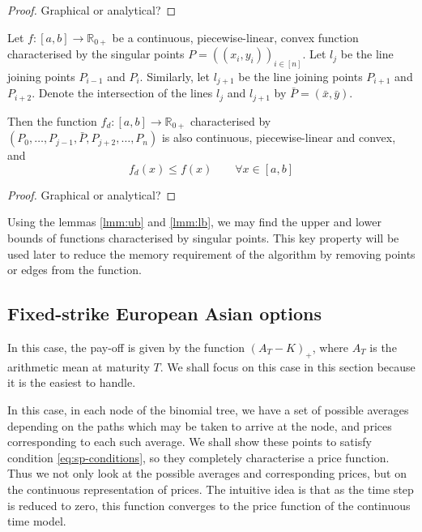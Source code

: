 \begin{proof}
	Graphical or analytical?
\end{proof}

\begin{lmm}
	\label{lmm:lb}
	Let $ f:[a,b] \to \mathbb{R}_{0+} $ be a continuous, piecewise-linear, convex function characterised by the singular points $ P = ( (x_i, y_i) )_{i \in [n]} $. Let $ l_{j} $ be the line joining points $ P_{i-1} $ and $ P_{i} $. Similarly, let $ l_{j+1} $ be the line joining points $ P_{i+1} $ and $ P_{i+2} $. Denote the intersection of the lines $ l_{j} $ and $ l_{j+1} $ by $ \bar{P} = ( \bar{x}, \bar{y} ) $.

	Then the function $ f_d: [a,b] \to \mathbb{R}_{0+} $ characterised by $ (P_0, \dots, P_{j-1}, \bar{P}, P_{j+2}, \dots, P_n) $ is also continuous, piecewise-linear and convex, and
	\begin{equation}
	f_d(x) \leq f(x) \qquad \forall x \in [a,b]
	\end{equation}
\end{lmm}
\begin{proof}
	Graphical or analytical?
\end{proof}

Using the lemmas \ref{lmm:ub} and \ref{lmm:lb}, we may find the upper and lower bounds of functions characterised by singular points. This key property will be used later to reduce the memory requirement of the algorithm by removing points or edges from the function.

\subsection{Fixed-strike European Asian options}
In this case, the pay-off is given by the function $ (A_T - K)_+ $, where $ A_T $ is the arithmetic mean at maturity $T$.
We shall focus on this case in this section because it is the easiest to handle.

In this case, in each node of the binomial tree, we have a set of possible averages depending on the paths which may be taken to arrive at the node, and prices corresponding to each such average. We shall show these points to satisfy condition \ref{eq:sp-conditions}, so they completely characterise a price function. Thus we not only look at the possible averages and corresponding prices, but on the continuous representation of prices. The intuitive idea is that as the time step is reduced to zero, this function converges to the price function of the continuous time model.

